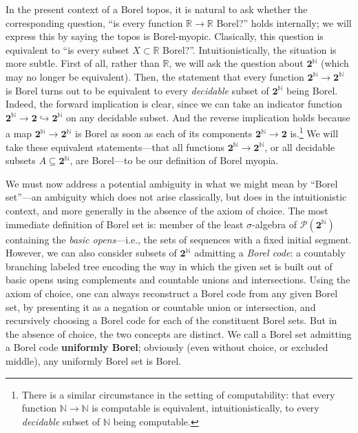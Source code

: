 \documentclass[11pt]{amsart}
\newcommand\defword[1]{\textbf{#1}}
\newcommand\hto{\hookrightarrow}
\newcommand{\N}{\mathbb{N}}
\newcommand\pow{\mathcal{P}}
\newcommand\R{\mathbb{R}}
\newcommand\two{\mathbf{2}}
\theoremstyle{definition}
\theoremstyle{remark}
\theoremstyle{plain}
\begin{document}
In the present context of a Borel topos, it is natural to ask whether the corresponding question, ``is every function \( \R \to \R \) Borel?'' holds internally; we will express this by saying the topos is Borel-myopic.
Clasically, this question is equivalent to ``is every subset \( X \subset \R \) Borel?''.
Intuitionistically, the situation is more subtle.
First of all, rather than \( \R \), we will ask the question about \( \two^\N \) (which may no longer be equivalent).
Then, the statement that every function \( \two^\N \to \two^\N \) is Borel turns out to be equivalent to every \emph{decidable} subset of \( \two^\N \) being Borel.
Indeed, the forward implication is clear, since we can take an indicator function \( \two^\N \to \two \hto \two^\N \) on any decidable subset.
And the reverse implication holds because a map \( \two^\N \to \two^\N \) is Borel as soon as each of its components \( \two^\N \to \two \) is.\footnote{
    There is a similar circumstance in the setting of computability: that every function \( \N \to \N \) is computable is equivalent, intuitionistically, to every \emph{decidable} subset of \( \N \) being computable.
}
We will take these equivalent statements---that all functions \( \two^\N \to \two^\N \), or all decidable subsets \( A \subseteq \two^\N \), are Borel---to be our definition of Borel myopia.

We must now address a potential ambiguity in what we might mean by ``Borel set''---an ambiguity which does not arise classically, but does in the intuitionistic context, and more generally in the absence of the axiom of choice.
The most immediate definition of Borel set is: member of the least \( \sigma \)-algebra of \( \pow(\two^\N) \) containing the \emph{basic opens}---i.e., the sets of sequences with a fixed initial segment.
However, we can also consider subsets of \( \two^\N \) admitting a \emph{Borel code}:
a countably branching labeled tree encoding the way in which the given set is built out of basic opens using complements and countable unions and intersections.
Using the axiom of choice, one can always reconstruct a Borel code from any given Borel set, by presenting it as a negation or countable union or intersection, and recursively choosing a Borel code for each of the constituent Borel sets.
But in the absence of choice, the two concepts are distinct.
We call a Borel set admitting a Borel code \defword{uniformly Borel}; obviously (even without choice, or excluded middle), any uniformly Borel set is Borel.
\end{document}
